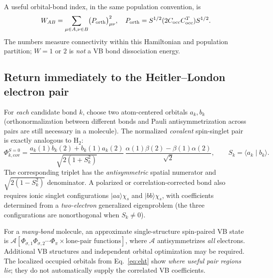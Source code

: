 \documentclass[11pt,letterpaper]{article}
\newcommand{\braket}[2]{\langle #1\mid #2\rangle}
\begin{document}
A useful orbital-bond index, in the same population convention, is
\begin{equation}\label{eq:wiberg}
W_{AB}=\sum_{\mu\in A,\nu\in B}\bigl(P_{\rm orth}\bigr)_{\mu\nu}^2,\quad
P_{\rm orth}=S^{1/2}(2C_{\rm occ}C_{\rm occ}^{T})S^{1/2}.
\end{equation}
The numbers measure connectivity within this Hamiltonian and population partition; $W=1$ or $2$ is \emph{not} a VB bond dissociation energy.

\subsection{Return immediately to the Heitler--London electron pair}
For \emph{each} candidate bond $k$, choose two atom-centered orbitals $a_k,b_k$ (orthonormalization between different bonds and Pauli antisymmetrization across pairs are still necessary in a molecule). The normalized \emph{covalent} spin-singlet pair is exactly analogous to $\mathrm H_2$:
\begin{equation}\label{eq:VBpair-general}
\boxed{\Phi_{k,\mathrm{cov}}^{S=0}=\frac{a_k(1)b_k(2)+b_k(1)a_k(2)}{\sqrt{2(1+S_k^2)}}
\,\frac{\alpha(1)\beta(2)-\beta(1)\alpha(2)}{\sqrt2},\qquad S_k=\braket{a_k}{b_k}.}
\end{equation}
The corresponding triplet has the \emph{antisymmetric} spatial numerator and $\sqrt{2(1-S_k^2)}$ denominator. A polarized or correlation-corrected bond also requires ionic singlet configurations $|aa\rangle\chi_s$ and $|bb\rangle\chi_s$, with coefficients determined from a \emph{two-electron} generalized eigenproblem (the three configurations are nonorthogonal when $S_k\ne0$).

For a \emph{many-bond} molecule, an approximate single-structure spin-paired VB state is $\mathcal A[\Phi_{\sigma,1}\Phi_{\sigma,2}\cdots\Phi_{\pi}\times\text{lone-pair functions}]$, where $\mathcal A$ antisymmetrizes \emph{all} electrons. Additional VB structures and independent orbital optimization may be required. The localized occupied orbitals from Eq.~\eqref{eq:eht} show \emph{where useful pair regions lie}; they do not automatically supply the correlated VB coefficients.
\end{document}
